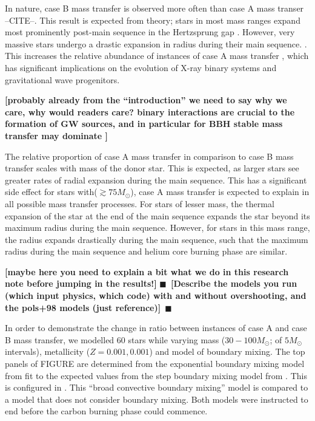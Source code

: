 \documentclass[twocolumn]{aastex63}
\newcommand{\todo}[1]{{\large $\blacksquare$~\textbf{\color{red}[#1]}}~$\blacksquare$}
\newcommand{\mr}[1]{{\textbf{\color{green!75!black}[#1]}}}
\begin{document}
In nature, case B mass transfer is observed more often than case A
mass transer --CITE--. This result is expected from theory; stars in
most mass ranges expand most prominently post-main sequence in the
Hertzsprung gap \citep{vandenheuvel:69}. However, very massive stars
undergo a drastic expansion in radius during their main
sequence. \citep[e.g.,][]{brott:11}. This increases the relative
abundance of instances of case A mass transfer \citep{demink:08}, which has significant implications on the evolution of X-ray binary systems and gravitational wave progenitors.

\mr{probably already from the ``introduction'' we need to say why we
  care, why would readers care? binary interactions are crucial to the
formation of GW sources, and in particular for BBH stable mass
transfer may dominate \cite{marchant:21, vanson:21}}

The relative proportion of case A mass transfer in comparison to case
B mass transfer scales with mass of the donor star. This is expected,
as larger stars see greater rates of radial expansion during the main
sequence. This has a significant side effect for stars with($\gtrsim 75M_{\odot}$), case A mass transfer is expected to explain
in all possible mass transfer processes. For stars of lesser mass, the
thermal expansion of the star at the end of the main sequence expands
the star beyond its maximum radius during the main sequence. However,
for stars in this mass range, the radius expands drastically during
the main sequence, such that the maximum radius during the main
sequence and helium core burning phase are similar.

\mr{maybe here you need to explain a bit what we do in this research
  note before jumping in the results!}  \todo{Describe the models you
  run (which input physics, which code) with and without overshooting,
  and the pols+98 models (just reference)}

In order to demonstrate the change in ratio between instances of case
A and case B mass transfer, we modelled 60 stars while varying mass
($30-100 M_{\odot}$; of $5M_{\odot}$ intervals), metallicity
($Z = 0.001,0.001$) and model of boundary mixing. The top panels of FIGURE are determined from the exponential boundary mixing model from \cite{04} fit to the expected values from the step boundary mixing model from \cite{brott:11}. This is configured in \cite{claret:18}. This ``broad convective boundary mixing'' model is compared to a model that does not consider boundary mixing. Both models were instructed to end before the carbon burning phase could commence.
\end{document}
